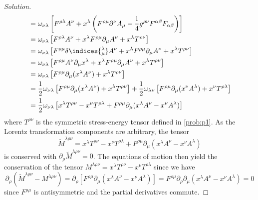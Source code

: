 \begin{proof}[Solution]
\begin{align*}
      &= \omega_{\nu \lambda}\left[F^{\rho \lambda} A^\nu + x^\lambda \left(F^{\rho \mu} \partial^\nu A_\mu - \frac14 g^{\rho \nu} F^{\alpha \beta} F_{\alpha \beta}\right)\right]\\
      &= \omega_{\nu \lambda} \left[F^{\rho \lambda} A^\nu + x^\lambda F^{\rho \mu} \partial_\mu A^\nu + x^\lambda T^{\rho \nu}\right]\\
      &= \omega_{\nu \lambda} \left[F^{\rho \mu} \delta\indices{^\lambda_\mu} A^\nu + x^\lambda F^{\rho \mu} \partial_\mu A^\nu + x^\lambda T^{\rho \nu}\right]\\
      &= \omega_{\nu \lambda} \left[F^{\rho \mu} A^\nu \partial_\mu x^\lambda + x^\lambda F^{\rho \mu} \partial_\mu A^\nu + x^\lambda T^{\rho \nu}\right]\\
      &= \omega_{\nu \lambda} \left[F^{\rho \mu} \partial_\mu( x^\lambda A^\nu) + x^\lambda T^{\rho \nu}\right]\\
      &= \frac12 \omega_{\nu \lambda} \left[F^{\rho \mu} \partial_\mu( x^\lambda A^\nu) + x^\lambda T^{\rho \nu}\right] + \frac12 \omega_{\lambda \nu}\left[F^{\rho \mu} \partial_\mu( x^\nu A^\lambda) + x^\nu T^{\rho \lambda}\right]\\
      &= \frac12 \omega_{\nu \lambda} \left[x^{\lambda} T^{\rho \nu} - x^\nu T^{\rho \lambda} + F^{\rho \mu} \partial_\mu (x^\lambda A^\nu - x^\nu A^{\lambda})\right] 
   \end{align*}
   where \(T^{\rho\nu}\) is the symmetric stress-energy tensor defined in \cref{prob:p1}. As the Lorentz transformation components are arbitrary, the tensor
   \begin{equation*}
      \tilde{M}^{\lambda \rho \nu} = x^{\lambda} T^{\rho \nu} - x^\nu T^{\rho \lambda} + F^{\rho \mu} \partial_\mu(x^\lambda A^\nu - x^\nu A^\lambda)
   \end{equation*}
   is conserved with \(\partial_\rho \tilde{M}^{\lambda \rho \nu} = 0\). The equations of motion then yield the conservation of the tensor \(M^{\lambda \rho \nu} = x^{\lambda}T^{\rho \nu} - x^{\nu}T^{\rho \lambda}\) since we have
   \begin{equation*}
      \partial_\rho (\tilde{M}^{\lambda \rho \nu} - M^{\lambda \rho \nu}) = \partial_\rho \left[F^{\rho \mu} \partial_\mu(x^\lambda A^\nu - x^\nu A^\lambda)\right]  = F^{\rho \mu} \partial_\rho \partial_\mu (x^\lambda A^\nu - x^\nu A^\lambda) = 0
   \end{equation*}
   since \(F^{\rho \mu}\) is antisymmetric and the partial derivatives commute.
\end{proof}
